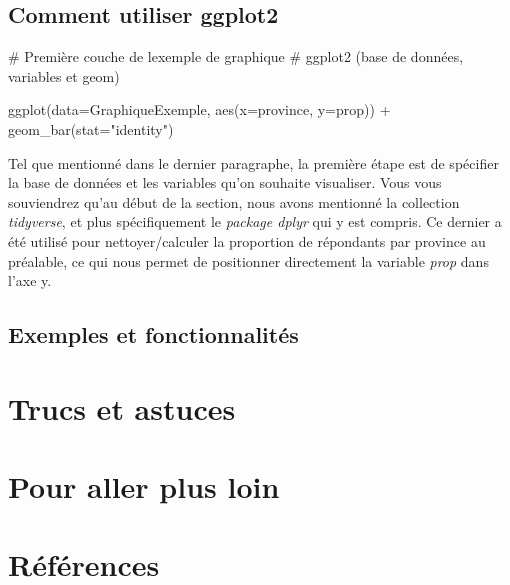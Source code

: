 \documentclass[
  letterpaper,
]{scrbook}
\newenvironment{Shaded}{\begin{snugshade}}{\end{snugshade}}
\newcommand{\AttributeTok}[1]{\textcolor[rgb]{0.40,0.45,0.13}{#1}}
\newcommand{\CommentTok}[1]{\textcolor[rgb]{0.37,0.37,0.37}{#1}}
\newcommand{\FunctionTok}[1]{\textcolor[rgb]{0.28,0.35,0.67}{#1}}
\newcommand{\NormalTok}[1]{\textcolor[rgb]{0.00,0.23,0.31}{#1}}
\newcommand{\SpecialCharTok}[1]{\textcolor[rgb]{0.37,0.37,0.37}{#1}}
\newcommand{\StringTok}[1]{\textcolor[rgb]{0.13,0.47,0.30}{#1}}
\begin{document}
\hypertarget{comment-utiliser-ggplot2}{%
\subsection{Comment utiliser ggplot2}\label{comment-utiliser-ggplot2}}

\begin{Shaded}
\begin{Highlighting}[]
\CommentTok{\# Première couche de l\textquotesingle{}exemple de graphique}
\CommentTok{\# ggplot2 (base de données, variables et geom)}

\FunctionTok{ggplot}\NormalTok{(}\AttributeTok{data=}\NormalTok{GraphiqueExemple, }\FunctionTok{aes}\NormalTok{(}\AttributeTok{x=}\NormalTok{province, }\AttributeTok{y=}\NormalTok{prop)) }\SpecialCharTok{+}
  \FunctionTok{geom\_bar}\NormalTok{(}\AttributeTok{stat=}\StringTok{"identity"}\NormalTok{) }
\end{Highlighting}
\end{Shaded}

Tel que mentionné dans le dernier paragraphe, la première étape est de
spécifier la base de données et les variables qu'on souhaite visualiser.
Vous vous souviendrez qu'au début de la section, nous avons mentionné la
collection \emph{tidyverse}, et plus spécifiquement le \emph{package
dplyr} qui y est compris. Ce dernier a été utilisé pour
nettoyer/calculer la proportion de répondants par province au préalable,
ce qui nous permet de positionner directement la variable \emph{prop}
dans l'axe y.

\hypertarget{exemples-et-fonctionnalituxe9s}{%
\subsection{Exemples et
fonctionnalités}\label{exemples-et-fonctionnalituxe9s}}

\hypertarget{trucs-et-astuces}{%
\section{Trucs et astuces}\label{trucs-et-astuces}}

\hypertarget{pour-aller-plus-loin}{%
\section{Pour aller plus loin}\label{pour-aller-plus-loin}}

\clearpage

\hypertarget{ruxe9fuxe9rences}{%
\section{Références}\label{ruxe9fuxe9rences}}
\end{document}
